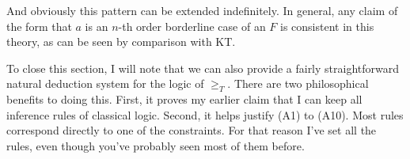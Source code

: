 
\noindent And obviously this pattern can be extended indefinitely. In general, any claim of the form that \(a\) is an \(n\){}-th order borderline case of an \(F\) is consistent in this theory, as can be seen by comparison with KT.

To close this section, I will note that we can also provide a fairly straightforward natural deduction system for the logic of \(\geqslant _T\). There are two philosophical benefits to doing this. First, it proves my earlier claim that I can keep all inference rules of classical logic. Second, it helps justify (A1) to (A10). Most rules correspond directly to one of the constraints. For that reason I've set all the rules, even though you've probably seen most of them before.

